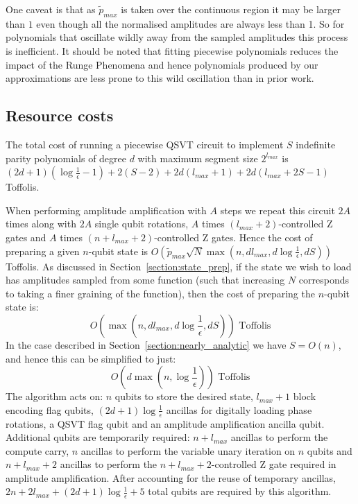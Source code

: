 \documentclass[a4paper,twocolumn,,accepted=2025-05-27]{quantumarticle}
\theoremstyle{empty}
\begin{document}
One caveat is that as $\tilde{p}_{max}$ is taken over the continuous region it may be larger than $1$ even though all the normalised amplitudes are always less than 1. So for polynomials that oscillate wildly away from the sampled amplitudes this process is inefficient. It should be noted that fitting piecewise polynomials reduces the impact of the Runge Phenomena and hence polynomials produced by our approximations are less prone to this wild oscillation than in prior work. 

\subsection{Resource costs}
\label{section:resource}
The total cost of running a piecewise QSVT circuit to implement $S$ indefinite parity polynomials of degree $d$ with maximum segment size $2^{l_{max}}$ is $(2d+1)(\log\frac{1}{\epsilon}-1) + 2(S-2) + 2d(l_{max}+1) + 2d(l_{max} + 2S -1)$ Toffolis. 

When performing amplitude amplification with $A$ steps we repeat this circuit $2A$ times along with $2A$ single qubit rotations, $A$ times $(l_{max}+2)$-controlled Z gates and $A$ times $(n+l_{max}+2)$-controlled Z gates. Hence the cost of preparing a given $n$-qubit state is $O\left(\tilde{p}_{max}\sqrt{N}\max(n,dl_{max},d\log \frac{1}{\epsilon}, dS)\right)$ Toffolis. As discussed in Section~\ref{section:state_prep}, if the state we wish to load has amplitudes sampled from some function (such that increasing $N$ corresponds to taking a finer graining of the function), then the cost of preparing the $n$-qubit state is:
\begin{equation}
    O\left(\max\left(n,dl_{max},d\log \frac{1}{\epsilon}, dS\right)\right) \text{ Toffolis}
\end{equation}
In the case described in Section~\ref{section:nearly_analytic} we have $S = O(n)$, and hence this can be simplified to just:
\begin{equation}
    O\left(d\max\left(n, \log \frac{1}{\epsilon}\right)\right)  \text{ Toffolis}
\end{equation}
The algorithm acts on: $n$ qubits to store the desired state, $l_{max} + 1$ block encoding flag qubits, $(2d+1)\log\frac{1}{\epsilon}$ ancillas for digitally loading phase rotations, a QSVT flag qubit and an amplitude amplification ancilla qubit. Additional qubits are temporarily required: $n + l_{max}$ ancillas to perform the compute carry, $n$ ancillas to perform the variable unary iteration on $n$ qubits and $n+l_{max}+2$ ancillas to perform the $n+l_{max} +2$-controlled Z gate required in amplitude amplification. After accounting for the reuse of temporary ancillas, $2n + 2l_{max} + (2d+1)\log\frac{1}{\epsilon} + 5$ total qubits are required by this algorithm.
\end{document}
